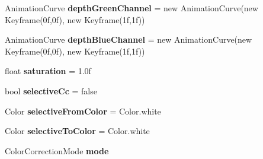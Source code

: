 \begin{DoxyCompactItemize}
\item 
Animation\+Curve {\bfseries depth\+Green\+Channel} = new Animation\+Curve(new Keyframe(0f,0f), new Keyframe(1f,1f))\hypertarget{class_unity_standard_assets_1_1_image_effects_1_1_color_correction_curves_a970ebb883db7df47710dadc12763cb3e}{}\label{class_unity_standard_assets_1_1_image_effects_1_1_color_correction_curves_a970ebb883db7df47710dadc12763cb3e}

\item 
Animation\+Curve {\bfseries depth\+Blue\+Channel} = new Animation\+Curve(new Keyframe(0f,0f), new Keyframe(1f,1f))\hypertarget{class_unity_standard_assets_1_1_image_effects_1_1_color_correction_curves_a308d07f36a756f45afe4e308692a3d92}{}\label{class_unity_standard_assets_1_1_image_effects_1_1_color_correction_curves_a308d07f36a756f45afe4e308692a3d92}

\item 
float {\bfseries saturation} = 1.\+0f\hypertarget{class_unity_standard_assets_1_1_image_effects_1_1_color_correction_curves_afdca84a10eb0cb06591f433006f90a63}{}\label{class_unity_standard_assets_1_1_image_effects_1_1_color_correction_curves_afdca84a10eb0cb06591f433006f90a63}

\item 
bool {\bfseries selective\+Cc} = false\hypertarget{class_unity_standard_assets_1_1_image_effects_1_1_color_correction_curves_a0f7d4c94911e7aca3c98f09572087e74}{}\label{class_unity_standard_assets_1_1_image_effects_1_1_color_correction_curves_a0f7d4c94911e7aca3c98f09572087e74}

\item 
Color {\bfseries selective\+From\+Color} = Color.\+white\hypertarget{class_unity_standard_assets_1_1_image_effects_1_1_color_correction_curves_a08100d03d76ce9135035e40c7fe37414}{}\label{class_unity_standard_assets_1_1_image_effects_1_1_color_correction_curves_a08100d03d76ce9135035e40c7fe37414}

\item 
Color {\bfseries selective\+To\+Color} = Color.\+white\hypertarget{class_unity_standard_assets_1_1_image_effects_1_1_color_correction_curves_aaaf2f0df23c20d9045ec63368e59f176}{}\label{class_unity_standard_assets_1_1_image_effects_1_1_color_correction_curves_aaaf2f0df23c20d9045ec63368e59f176}

\item 
Color\+Correction\+Mode {\bfseries mode}\hypertarget{class_unity_standard_assets_1_1_image_effects_1_1_color_correction_curves_aadb7fb2fa0e4f1548eea3742a4c795ef}{}\label{class_unity_standard_assets_1_1_image_effects_1_1_color_correction_curves_aadb7fb2fa0e4f1548eea3742a4c795ef}


\end{DoxyCompactItemize}
